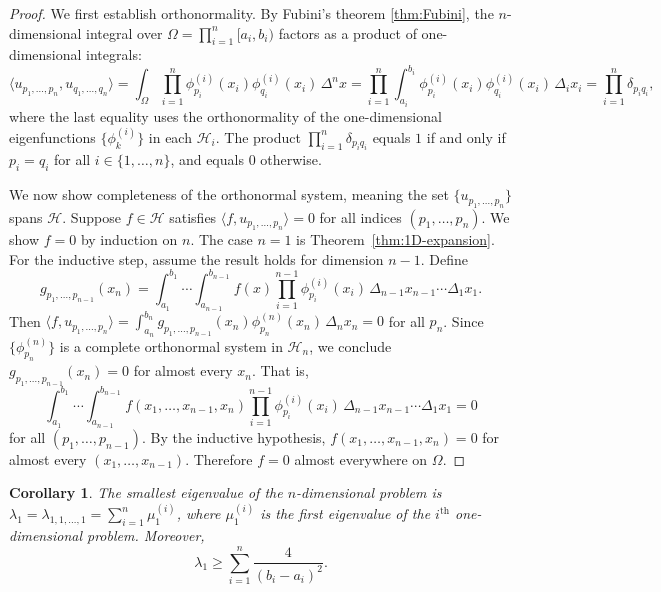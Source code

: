 \documentclass{article}
\newtheorem{corollary}[theorem]{Corollary}
\numberwithin{equation}{section}
\numberwithin{theorem}{section}
\begin{document}
\begin{proof}
We first establish orthonormality. By Fubini's theorem \eqref{thm:Fubini}, the $n$-dimensional integral over $\Omega = \displaystyle \prod_{i=1}^n [a_i, b_i)$ factors as a product of one-dimensional integrals:
$$\langle u_{p_1, \ldots, p_n}, u_{q_1, \ldots, q_n} \rangle = \int_{\Omega} \prod_{i=1}^{n} \phi_{p_i}^{(i)}(x_i) \phi_{q_i}^{(i)}(x_i) \, \Delta^n x = \prod_{i=1}^{n} \int_{a_i}^{b_i} \phi_{p_i}^{(i)}(x_i) \phi_{q_i}^{(i)}(x_i) \, \Delta_i x_i = \displaystyle\prod_{i=1}^{n} \delta_{p_i q_i},$$
where the last equality uses the orthonormality of the one-dimensional eigenfunctions $\{\phi_k^{(i)}\}$ in each $\mathscr{H}_i$. The product $\displaystyle\prod_{i=1}^{n} \delta_{p_i q_i}$ equals $1$ if and only if $p_i = q_i$ for all $i \in \{1, \ldots, n\}$, and equals $0$ otherwise.

We now show completeness of the orthonormal system, meaning the set $\{u_{p_1, \ldots, p_n}\}$ spans $\mathscr{H}$. Suppose $f \in \mathscr{H}$ satisfies $\langle f, u_{p_1, \ldots, p_n} \rangle = 0$ for all indices $(p_1, \ldots, p_n)$. We show $f = 0$ by induction on $n$. The case $n = 1$ is Theorem~\ref{thm:1D-expansion}. For the inductive step, assume the result holds for dimension $n-1$. Define
$$g_{p_1, \ldots, p_{n-1}}(x_n) = \int_{a_1}^{b_1} \cdots \int_{a_{n-1}}^{b_{n-1}} f(x) \prod_{i=1}^{n-1} \phi_{p_i}^{(i)}(x_i) \, \Delta_{n-1} x_{n-1} \cdots \Delta_1 x_1.$$
Then $\langle f, u_{p_1, \ldots, p_n} \rangle = \int_{a_n}^{b_n} g_{p_1, \ldots, p_{n-1}}(x_n) \phi_{p_n}^{(n)}(x_n) \, \Delta_n x_n = 0$ for all $p_n$. Since $\{\phi_{p_n}^{(n)}\}$ is a complete orthonormal system in $\mathscr{H}_n$, we conclude $g_{p_1, \ldots, p_{n-1}}(x_n) = 0$ for almost every $x_n$. That is,
$$\int_{a_1}^{b_1} \cdots \int_{a_{n-1}}^{b_{n-1}} f(x_1, \ldots, x_{n-1}, x_n) \prod_{i=1}^{n-1} \phi_{p_i}^{(i)}(x_i) \, \Delta_{n-1} x_{n-1} \cdots \Delta_1 x_1 = 0$$
for all $(p_1, \ldots, p_{n-1})$. By the inductive hypothesis, $f(x_1, \ldots, x_{n-1}, x_n) = 0$ for almost every $(x_1, \ldots, x_{n-1})$. Therefore $f = 0$ almost everywhere on $\Omega$.
\end{proof}
\begin{corollary}\label{cor:first-eigenvalue}
The smallest eigenvalue of the $n$-dimensional problem is
$\lambda_1 = \lambda_{1,1,\ldots,1} = \displaystyle\sum_{i=1}^{n} \mu_1^{(i)}$, where $\mu_1^{(i)}$ is the first eigenvalue of the $i^{\text{th}}$ one-dimensional problem. Moreover,
\begin{equation}\label{eq:lambda1-nD-bound}
\lambda_1 \geq \sum_{i=1}^{n} \frac{4}{(b_i - a_i)^2}.
\end{equation}
\end{corollary}
\end{document}
